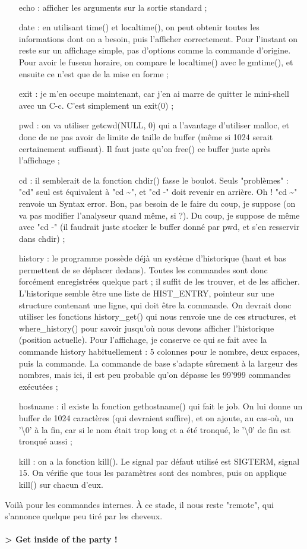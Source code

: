 \\\begin{itemize}
\item[echo :] afficher les arguments sur la sortie standard ;
\\\item[date :] en utilisant time() et localtime(), on peut obtenir toutes les informations dont on a besoin, puis l'afficher correctement. Pour l'instant on reste sur un affichage simple, pas d'options comme la commande d'origine. Pour avoir le fuseau horaire, on compare le localtime() avec le gmtime(), et ensuite ce n'est que de la mise en forme ;
\\\item[exit :] je m'en occupe maintenant, car j'en ai marre de quitter le mini-shell avec un C-c. C'est simplement un exit(0) ;
\\\item[pwd :] on va utiliser getcwd(NULL, 0) qui a l'avantage d'utiliser malloc, et donc de ne pas avoir de limite de taille de buffer (même si 1024 serait certainement suffisant). Il faut juste qu'on free() ce buffer juste après l'affichage ;
\\\item[cd :] il semblerait de la fonction chdir() fasse le boulot. Seuls "problèmes" : "cd" seul est équivalent à "cd \textasciitilde", et "cd -" doit revenir en arrière. Oh ! "cd \textasciitilde" renvoie un Syntax error. Bon, pas besoin de le faire du coup, je suppose (on va pas modifier l'analyseur quand même, si ?). Du coup, je suppose de même avec "cd -" (il faudrait juste stocker le buffer donné par pwd, et s'en resservir dans chdir) ;
\\\item[history :] le programme possède déjà un système d'historique (haut et bas permettent de se déplacer dedans). Toutes les commandes sont donc forcément enregistrées quelque part ; il suffit de les trouver, et de les afficher. L'historique semble être une liste de HIST\_ENTRY, pointeur sur une structure contenant une ligne, qui doit être la commande. On devrait donc utiliser les fonctions history\_get() qui nous renvoie une de ces structures, et where\_history() pour savoir jusqu'où nous devons afficher l'historique (position actuelle). Pour l'affichage, je conserve ce qui se fait avec la commande history habituellement : 5 colonnes pour le nombre, deux espaces, puis la commande. La commande de base s'adapte sûrement à la largeur des nombres, mais ici, il est peu probable qu'on dépasse les 99'999 commandes exécutées ;
\\\item[hostname :] il existe la fonction gethostname() qui fait le job. On lui donne un buffer de 1024 caractères (qui devraient suffire), et on ajoute, au cas-où, un '\textbackslash{0}' à la fin, car si le nom était trop long et a été tronqué, le '\textbackslash{0}' de fin est tronqué aussi ;
\\\item[kill :] on a la fonction kill(). Le signal par défaut utilisé est SIGTERM, signal 15. On vérifie que tous les paramètres sont des nombres, puis on applique kill() sur chacun d'eux.
\\\end{itemize}
Voilà pour les commandes internes. À ce stade, il nous reste "remote", qui s'annonce quelque peu tiré par les cheveux.
\\\\
\textbf{> Get inside of the party !}
